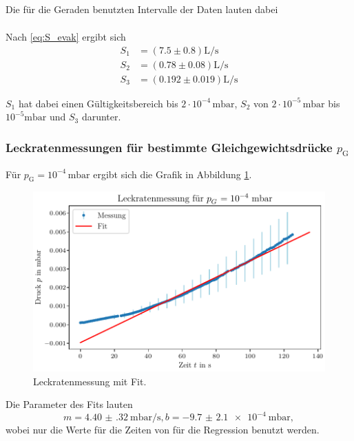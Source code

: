 Die für die Geraden benutzten Intervalle der Daten lauten dabei
\begin{align}
\end{align}

Nach \eqref{eq:S_evak} ergibt sich
\begin{align}
    S_1 &= (\num{7.5} \pm \num{0.8}) \si{\liter\per\second} \\
    S_2 &= (\num{0.78} \pm \num{0.08}) \si{\liter\per\second} \\
    S_3 &= (\num{0.192} \pm \num{0.019}) \si{\liter\per\second} 
\end{align}

$S_1$ hat dabei einen Gültigkeitsbereich bis $\num{2}\cdot 10^{-4} \, \si{\milli\bar}$, $S_2$ von $\num{2}\cdot 10^{-5} \, \si{\milli\bar}$ bis $10^{-5} \si{\milli\bar}$ und $S_3$ darunter.

\subsubsection{Leckratenmessungen für bestimmte Gleichgewichtsdrücke $p_\text{G}$}

Für $p_\text{G} = 10^{-4} \, \si{\milli\bar}$ ergibt sich die Grafik in Abbildung \ref{fig:TP_Leck_1e4}.

\begin{figure}[H]
    \centering
    \includegraphics[width=\textwidth]{plots/TP_Leck_1e4.pdf}
    \caption{Leckratenmessung mit Fit.}
    \label{fig:TP_Leck_1e4}
\end{figure}

Die Parameter des Fits lauten 
\begin{equation}
    m = \qty{4.40(32)}{\milli\bar\per\second}, b = \qty{-9.7(21)e-4}{\milli\bar},
\end{equation}
wobei nur die Werte für die Zeiten von %
für die Regression benutzt werden.

